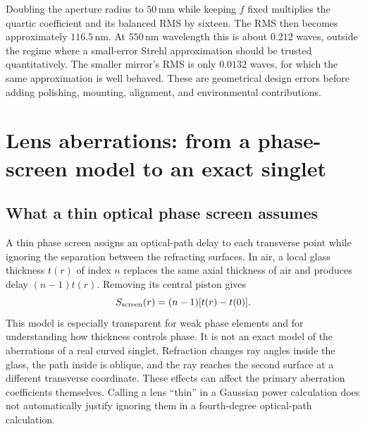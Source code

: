 Doubling the aperture radius to $50\,\mathrm{mm}$ while keeping $f$ fixed
multiplies the quartic coefficient and its balanced RMS by sixteen. The RMS
then becomes approximately $116.5\,\mathrm{nm}$. At $550\,\mathrm{nm}$
wavelength this is about $0.212$ waves, outside the regime where a small-error
Strehl approximation should be trusted quantitatively. The smaller mirror's
RMS is only $0.0132$ waves, for which the same approximation is well behaved.
These are geometrical design errors before adding polishing, mounting,
alignment, and environmental contributions.

\chapter{Lens aberrations: from a phase-screen model to an exact singlet}
\label{ab:lenses}

\section{What a thin optical phase screen assumes}
A thin phase screen assigns an optical-path delay to each transverse point
while ignoring the separation between the refracting surfaces. In air, a
local glass thickness $t(r)$ of index $n$ replaces the same axial thickness
of air and produces delay $(n-1)t(r)$. Removing its central piston gives
\begin{equation}
 S_{\rm screen}(r)=(n-1)[t(r)-t(0)].
 \label{ab:phasescreen}
\end{equation}
This model is especially transparent for weak phase elements and for
understanding how thickness controls phase. It is not an exact model of the
aberrations of a real curved singlet. Refraction changes ray angles inside
the glass, the path inside is oblique, and the ray reaches the second surface
at a different transverse coordinate. These effects can affect the primary
aberration coefficients themselves. Calling a lens ``thin'' in a Gaussian
power calculation does not automatically justify ignoring them in a
fourth-degree optical-path calculation.

